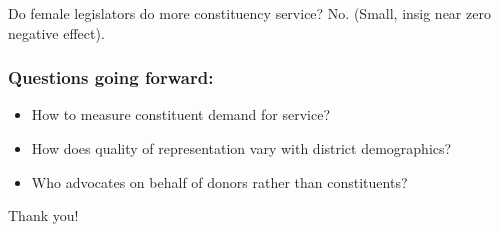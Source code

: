 \documentclass[13pt]{beamer}
\begin{document}

\begin{frame}

\begin{center}
\Large
Do female legislators do more constituency service?  
\pause
No.  (Small, insig near zero negative effect).  
\end{center}
\end{frame}






\begin{frame}
\frametitle{Questions going forward:}
\Large 
\begin{itemize}
\item How to measure constituent demand for service?
\item How does quality of representation vary with district demographics?
\item Who advocates on behalf of donors rather than constituents?
\end{itemize}
\bigskip
\end{frame}

\begin{frame}
\centering
\huge
Thank you! 
\end{frame}
\begin{frame}
\maketitle
\end{frame}
\end{document}

